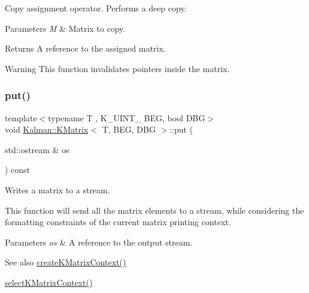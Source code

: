 Copy assignment operator. Performs a deep copy. 


\begin{DoxyParams}{Parameters}
{\em M} & Matrix to copy. \\
\hline
\end{DoxyParams}
\begin{DoxyReturn}{Returns}
A reference to the assigned matrix. 
\end{DoxyReturn}
\begin{DoxyWarning}{Warning}
This function invalidates pointers inside the matrix. 
\end{DoxyWarning}
\mbox{\label{classKalman_1_1KMatrix_aa71c0b0962aafb9ba3f811a744b010d9}} 
\subsubsection{\texorpdfstring{put()}{put()}}
{\footnotesize\ttfamily template$<$typename T , K\+\_\+\+U\+I\+N\+T\+\_ B\+EG, bool D\+BG$>$ \\
void \mbox{\hyperlink{classKalman_1_1KMatrix}{Kalman\+::\+K\+Matrix}}$<$ T, B\+EG, D\+BG $>$\+::put (\begin{DoxyParamCaption}\item[{std\+::ostream \&}]{os }\end{DoxyParamCaption}) const\hspace{0.3cm}{\ttfamily [inline]}}



Writes a matrix to a stream. 

This function will send all the matrix elements to a stream, while considering the formatting constraints of the current matrix printing context. 
\begin{DoxyParams}{Parameters}
{\em os} & A reference to the output stream. \\
\hline
\end{DoxyParams}
\begin{DoxySeeAlso}{See also}
{\ttfamily \mbox{\hyperlink{namespaceKalman_a2cdf35271265736a5d7021c18233ae34}{create\+K\+Matrix\+Context()}}} 

{\ttfamily \mbox{\hyperlink{namespaceKalman_a1a0ed1b72b32aa8a1a12bb4212539807}{select\+K\+Matrix\+Context()}}} 
\end{DoxySeeAlso}
\mbox{\label{classKalman_1_1KMatrix_a7e78b888fa945c1e5c8cd0513a7f9692}} 
